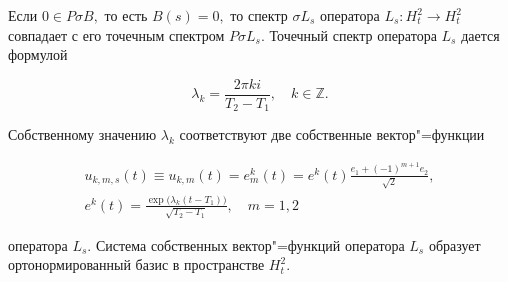 \hypertarget{korn:lemma:4}{}



\begin{lemma}[4]Если $0\in P\sigma B,$ то есть $B(s)=0,$ то спектр $\sigma L_s$ оператора $L_s:H_t^2\to H_t^2$ совпадает с его точечным спектром $P\sigma L_s.$ Точечный спектр оператора $L_s$ дается формулой

\begin{equation}

\label{kor:eq2.3}

\lambda_k = \frac{2\pi k i}{T_2-T_1}, \quad k\in\mathbb{Z}.

\end{equation}

Собственному значению $\lambda_k$ соответствуют две собственные вектор"=функции

\begin{gather}

\label{kor:eq2.4}

u_{k,m,s}(t)\equiv u_{k,m}(t)=e_m^k(t)=e^k(t)\frac{e_1+(-1)^{m+1}e_2}{\sqrt2},

\\

e^k(t)=\frac{\exp \bigl(\lambda_k(t-T_1)\bigr)}{\sqrt{T_2-T_1}}, \quad m=1, 2

\end{gather}

оператора $L_s.$ Система собственных вектор"=функций оператора $L_s$ образует ортонормированный базис в пространстве $H_t^2.$

\end{lemma}



\smallskip



